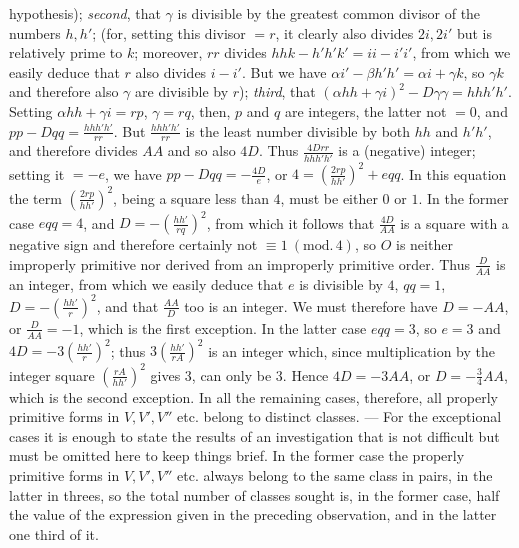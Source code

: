 hypothesis); \textit{second}, that \(\gamma\) is divisible by the greatest common divisor of the numbers \(h,h'\); (for, setting this divisor \(=r\), it clearly also divides \(2i,2i'\) but is relatively prime to \(k\); moreover, \(rr\) divides \(hhk-h'h'k'=ii-i'i'\), from which we easily deduce that \(r\) also divides \(i-i'\). But we have \(\alpha i'-\beta h'h'=\alpha i+\gamma k\), so \(\gamma k\) and therefore also \(\gamma\) are divisible by \(r\)); \textit{third}, that \((\alpha hh+\gamma i)^2-D\gamma\gamma=hhh'h'\). Setting \(\alpha hh+\gamma i=rp\), \(\gamma=rq\), then, \(p\) and \(q\) are integers, the latter not \(=0\), and \(pp-Dqq=\frac{hhh'h'}{rr}\). But \(\frac{hhh'h'}{rr}\) is the least number divisible by both \(hh\) and \(h'h'\), and therefore divides \(AA\) and so also \(4D\). Thus \(\frac{4Drr}{hhh'h'}\) is a (negative) integer; setting it \(=-e\), we have \(pp-Dqq=-\frac{4D}{e}\), or \(4=(\frac{2rp}{hh'})^2+eqq\). In this equation the term \((\frac{2rp}{hh'})^2\), being a square less than \(4\), must be either \(0\) or \(1\). In the former case \(eqq=4\), and \(D=-(\frac{hh'}{rq})^2\), from which it follows that \(\frac{4D}{AA}\) is a square with a negative sign and therefore certainly not \(\equiv1\ (\mathrm{mod.}\,4)\), so \(O\) is neither improperly primitive nor derived from an improperly primitive order. Thus \(\frac{D}{AA}\) is an integer, from which we easily deduce that \(e\) is divisible by \(4\), \(qq=1\), \(D=-(\frac{hh'}{r})^2\), and that \(\frac{AA}{D}\) too is an integer. We must therefore have \(D=-AA\), or \(\frac{D}{AA}=-1\), which is the first exception. In the latter case \(eqq=3\), so \(e=3\) and \(4D=-3(\frac{hh'}{r})^2\); thus \(3(\frac{hh'}{rA})^2\) is an integer which, since multiplication by the integer square \((\frac{rA}{hh'})^2\) gives \(3\), can only be \(3\). Hence \(4D=-3AA\), or \(D=-\frac34 AA\), which is the second exception. In all the remaining cases, therefore, all properly primitive forms in \(V,V',V''\) etc. belong to distinct classes. --- For the exceptional cases it is enough to state the results of an investigation that is not difficult but must be omitted here to keep things brief. In the former case the properly primitive forms in \(V,V',V''\) etc. always belong to the same class in pairs, in the latter in threes, so the total number of classes sought is, in the former case, half the value of the expression given in the preceding observation, and in the latter one third of it.

